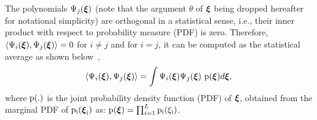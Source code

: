 \documentclass[letter,1p,11pt,oneside,onecolumn,sort&compress]{elsarticle}
\begin{document}
The polynomials ${\Psi }_j (\mbox{\boldmath $\xi$})$ (note that the argument $\theta$ of $\mbox{\boldmath $\xi$}$ being dropped hereafter for notational simplicity) are orthogonal in a statistical sense, i.e., their inner product with respect to probability measure (PDF) is zero. Therefore, $\left< \Psi_i({\mbox{\boldmath $\xi$}}) , \Psi_j({\mbox{\boldmath $\xi$}}) \right> = 0$ for $i \ne j$ and for $i = j$, it can be computed as the statistical average as shown below~\cite{ghanemSFEM1991},
\begin{equation}
\left<  {\Psi }_{i}{\rm (}{\mbox{\boldmath $\xi$}} {\rm )} , {\Psi }_{j}{\rm (}{\mbox{\boldmath $\xi$}} {\rm )}\right> = \int {\Psi }_{i}{\rm (}{\mbox{\boldmath $\xi$}} {\rm )} {\Psi }_{j}{\rm (}{\mbox{\boldmath $\xi$}} {\rm )} \ {{\rm p}}({\mbox{\boldmath $\xi$}}) d\mbox{\boldmath $\xi$},
\label{innerprod}
\end{equation}
where ${\rm p(.)}$ is the joint probability density function (PDF) of $\mbox{\boldmath $\xi$}$, obtained from the marginal PDF of ${\rm p_i(\mbox{\boldmath $\xi$}_i)}$ as: ${\rm p(\mbox{\boldmath $\xi$})} = \prod_{i=1}^L {\rm p_i(\xi_i)}$.
\end{document}
